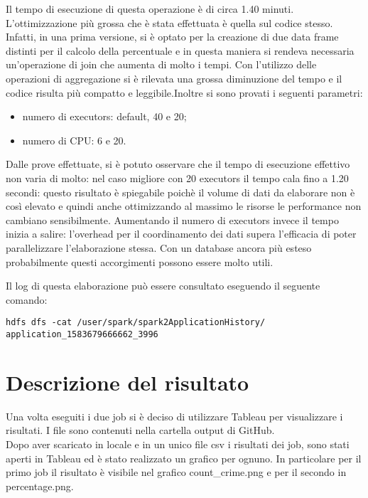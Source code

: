 \documentclass[10pt]{article}
\begin{document}
Il tempo di esecuzione di questa operazione è di circa 1.40 minuti.
L'ottimizzazione più grossa che è stata effettuata è quella sul codice stesso. Infatti, in una prima versione, si è optato per la creazione di due data frame distinti per il calcolo della percentuale e in questa maniera si rendeva necessaria un'operazione di join che aumenta di molto i tempi. Con l'utilizzo delle operazioni di aggregazione si è rilevata una grossa diminuzione del tempo e il codice risulta più compatto e leggibile.Inoltre si sono provati i seguenti parametri:
\begin{itemize}
\item numero di executors: default, 40 e 20;
\item numero di CPU: 6 e 20.
\end{itemize}
Dalle prove effettuate, si è potuto osservare che il tempo di esecuzione effettivo non varia di molto: nel caso migliore con 20 executors il tempo cala fino a 1.20 secondi: questo risultato è spiegabile poichè il volume di dati da elaborare non è così elevato e quindi anche ottimizzando al massimo le risorse le performance non cambiano sensibilmente. Aumentando il numero di executors invece il tempo inizia a salire: l'overhead per il coordinamento dei dati supera l'efficacia di poter parallelizzare l'elaborazione stessa. Con un database ancora più esteso probabilmente questi accorgimenti possono essere molto utili. 

Il log di questa elaborazione può essere consultato eseguendo il seguente comando:
\begin{lstlisting}
hdfs dfs -cat /user/spark/spark2ApplicationHistory/
application_1583679666662_3996
\end{lstlisting}


\section{Descrizione del risultato}
Una volta eseguiti i due job si è deciso di utilizzare Tableau per visualizzare i risultati. I file sono contenuti nella cartella output di GitHub. \\
Dopo aver scaricato in locale e in un unico file csv i risultati dei job, sono stati aperti in Tableau ed è stato realizzato un grafico per ognuno. In particolare per il primo job il risultato è visibile nel grafico count\_crime.png e per il secondo in percentage.png.
\end{document}
